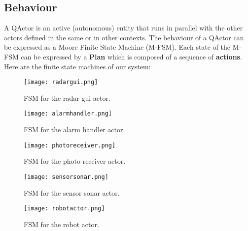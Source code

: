 \subsection{Behaviour}
A QActor is an active (autonomous) entity that runs in parallel with the other actors defined in the same or in other contexts. The behaviour of a QActor can be expressed as a Moore Finite State Machine (M-FSM). Each state of the M-FSM can be expressed by a \textbf{Plan} which is composed of a sequence of \textbf{actions}.
Here are the finite state machines of our system:
\begin{figure}[h]
	\centering
	\texttt{[image: radargui.png]}
	\caption{FSM for the radar gui actor.}
\end{figure}
\begin{figure}[h]
	\centering
	\texttt{[image: alarmhandler.png]}
	\caption{FSM for the alarm handler actor.}
\end{figure}
\begin{figure}[h]
	\centering
	\texttt{[image: photoreceiver.png]}
	\caption{FSM for the photo receiver actor.}
\end{figure}
\begin{figure}[h]
	\centering
	\texttt{[image: sensorsonar.png]}
	\caption{FSM for the sensor sonar actor.}
\end{figure}
\begin{figure}[h]
	\centering
	\texttt{[image: robotactor.png]}
	\caption{FSM for the robot actor.}
\end{figure}
\clearpage